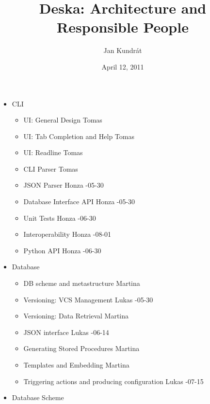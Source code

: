 \documentclass{article}
\begin{document}
\title{Deska: Architecture and Responsible People}

\author{Jan Kundrát}

\date{April 12, 2011}

\maketitle

\TabPositions{12cm,14cm}

\begin{itemize}
    \item CLI
        \begin{itemize}
            \item UI: General Design \tab Tomas
            \item UI: Tab Completion and Help \tab Tomas
            \item UI: Readline \tab Tomas
            \item CLI Parser \tab Tomas
            \item JSON Parser \tab Honza -05-30
            \item Database Interface API \tab Honza -05-30
            \item Unit Tests \tab Honza -06-30
            \item Interoperability \tab Honza -08-01
            \item Python API \tab Honza -06-30
        \end{itemize}
    \item Database
        \begin{itemize}
            \item DB scheme and metastructure \tab Martina
            \item Versioning: VCS Management \tab Lukas -05-30
            \item Versioning: Data Retrieval \tab Martina
            \item JSON interface \tab Lukas -06-14
            \item Generating Stored Procedures \tab Martina
            \item Templates and Embedding \tab Martina
            \item Triggering actions and producing configuration \tab Lukas -07-15
        \end{itemize}
    \item Database Scheme
        \begin{itemize}

\end{itemize}
\end{itemize}
\end{document}
